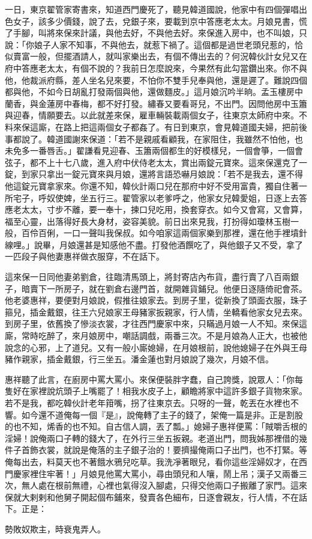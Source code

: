 一日，東京翟管家寄書來，知道西門慶死了，聽見韓道國說，他家中有四個彈唱出色女子，該多少價錢，說了去，兌銀子來，要載到京中答應老太太。月娘見書，慌了手腳，叫將來保來計議，與他去好，不與他去好。來保進入房中，也不叫娘，只說：「你娘子人家不知事，不與他去，就惹下禍了。這個都是過世老頭兒惹的，恰似賣富一般，但擺酒請人，就叫家樂出去，有個不傳出去的？何況韓伙計女兒又在府中答應老太太，有個不說的？我前日怎麼說來，今果然有此勾當鑽出來。你不與他，他裁派府縣，差人坐名兒來要，不怕你不雙手兒奉與他，還是遲了。難說四個都與他，不如今日胡亂打發兩個與他，還做麵皮。」這月娘沉吟半晌。孟玉樓房中蘭香，與金蓮房中春梅，都不好打發。繡春又要看哥兒，不出門。因問他房中玉簫與迎春，情願要去。以此就差來保，雇車輛裝載兩個女子，往東京太師府中來。不料來保這廝，在路上把這兩個女子都姦了。有日到東京，會見韓道國夫婦，把前後事都說了。韓道國謝來保道：「若不是親戚看顧我，在家阻住，我雖然不怕他，也未免多一番唇舌。」翟謙看見迎春、玉簫兩個都生的好模樣兒，一個會箏，一個會弦子，都不上十七八歲，進入府中伏侍老太太，賞出兩錠元寶來。這來保還克了一錠，到家只拿出一錠元寶來與月娘，還將言語恐嚇月娘說：「若不是我去，還不得他這錠元寶拿家來。你還不知，韓伙計兩口兒在那府中好不受用富貴，獨自住著一所宅子，呼奴使婢，坐五行三。翟管家以老爹呼之，他家女兒韓愛姐，日逐上去答應老太太，寸步不離，要一奉十，揀口兒吃用，換套穿衣。如今又會寫，又會算，福至心靈，出落得好長大身材，姿容美貌。前日出來見我，打扮得如瓊林玉樹一般，百伶百俐，一口一聲叫我保叔。如今咱家這兩個家樂到那裡，還在他手裡墳針線哩。」說畢，月娘還甚是知感他不盡。打發他酒饌吃了，與他銀子又不受，拿了一匹段子與他妻惠祥做衣服穿，不在話下。

這來保一日同他妻弟劉倉，往臨清馬頭上，將封寄店內布貨，盡行賣了八百兩銀子，暗賣下一所房子，就在劉倉右邊門首，就開雜貨鋪兒。他便日逐隨倚祀會茶。他老婆惠祥，要便對月娘說，假推往娘家去。到房子里，從新換了頭面衣服，珠子箍兒，插金戴銀，往王六兒娘家王母豬家扳親家，行人情，坐轎看他家女兒去來。到房子里，依舊換了慘淡衣裳，才往西門慶家中來，只瞞過月娘一人不知。來保這廝，常時吃醉了，來月娘房中，嘲話調戲，兩番三次。不是月娘為人正大，也被他說念的心邪，上了道兒。又有一般小廝媳婦，在月娘根前，說他媳婦子在外與王母豬作親家，插金戴銀，行三坐五。潘金蓮也對月娘說了幾次，月娘不信。

惠祥聽了此言，在廚房中罵大罵小。來保便裝胖字蠢，自己誇獎，說眾人：「你每隻好在家裡說炕頭子上嘴罷了！相我水皮子上，顧瞻將家中這許多銀子貨物來家。若不是我，都吃韓伙計老年箝嘴，拐了往東京去。只呀的一聲，乾丟在水裡也不響。如今還不道俺每一個『是』，說俺轉了主子的錢了，架俺一篇是非。正是割股的也不知，烯香的也不知。自古信人調，丟了瓢。」媳婦子惠祥便罵：「賊嚼舌根的淫婦！說俺兩口子轉的錢大了，在外行三坐五扳親。老道出門，問我姊那裡借的幾件子首飾衣裳，就說是俺落的主子銀子治的！要擠撮俺兩口子出門，也不打緊。等俺每出去，料莫天也不著餓水鴉兒吃草。我洗凈著眼兒，看你這些淫婦奴才，在西門慶家裡住牢著！」月娘見他罵大罵小，尋由頭兒和人嚷，鬧上吊；漢子又兩番三次，無人處在根前無禮，心裡也氣得沒入腳處，只得交他兩口子搬離了家門。這來保就大剌剌和他舅子開起個布鋪來，發賣各色細布，日逐會親友，行人情，不在話下。正是：

勢敗奴欺主，時衰鬼弄人。

